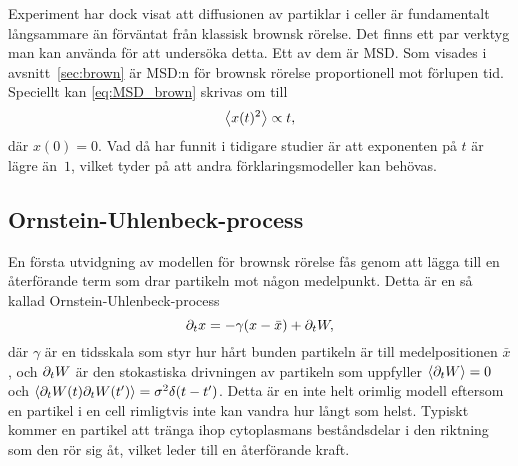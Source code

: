 Experiment\cite{Midtveldt_etal2016} har dock visat att diffusionen av partiklar i celler är fundamentalt långsammare än förväntat från klassisk brownsk rörelse. Det finns ett par verktyg man kan använda för att undersöka detta. Ett av dem är MSD. Som visades i avsnitt~\ref{sec:brown} är MSD:n för brownsk rörelse proportionell mot förlupen tid. Speciellt kan \eqref{eq:MSD_brown} skrivas om till
\begin{equation}
\ev{x(t)^2} \propto t,
\end{equation}
där $x(0)=0$. Vad \cite{Midtveldt_etal2016} då har funnit i tidigare studier är att exponenten på $t$ är lägre än~$1$, vilket tyder på att andra förklaringsmodeller kan behövas. %





\subsection{Ornstein-Uhlenbeck-process}
En första utvidgning av modellen för brownsk rörelse fås genom att lägga till en återförande term som drar partikeln mot någon medelpunkt. Detta är en så kallad Ornstein-Uhlenbeck-process
\begin{equation}\label{eq:SDE_o-u}
\partial_t x = -\gamma ( x-\bar{x} ) + \partial_t W,
\end{equation}
där $\gamma$ är en tidsskala som styr hur hårt bunden partikeln är till medelpositionen $\bar{x}$, och $\partial_t W$ är den stokastiska drivningen av partikeln som uppfyller $\ev{\pd_t W}=0$ och $\ev{\pd_t W(t)\pd_t W(t')} = \sigma^2\delta(t-t')$. Detta är en inte helt orimlig modell eftersom en partikel i en cell rimligtvis inte kan vandra hur långt som helst. Typiskt kommer en partikel att tränga ihop cytoplasmans beståndsdelar i den riktning som den rör sig åt, vilket leder till en återförande kraft.

